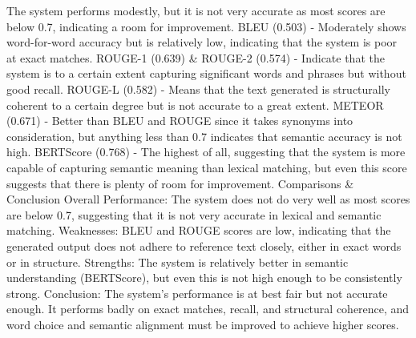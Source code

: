 The system performs modestly, but it is not very accurate as most scores are below 0.7, indicating a room for improvement.
 BLEU (0.503) - Moderately shows word-for-word accuracy but is relatively low, indicating that the system is poor at exact matches.
ROUGE-1 (0.639) \& ROUGE-2 (0.574) - Indicate that the system is to a certain extent capturing significant words and phrases but without good recall.
ROUGE-L (0.582) - Means that the text generated is structurally coherent to a certain degree but is not accurate to a great extent.
METEOR (0.671) - Better than BLEU and ROUGE since it takes synonyms into consideration, but anything less than 0.7 indicates that semantic accuracy is not high.
BERTScore (0.768) - The highest of all, suggesting that the system is more capable of capturing semantic meaning than lexical matching, but even this score suggests that there is plenty of room for improvement.
Comparisons \& Conclusion
Overall Performance: The system does not do very well as most scores are below 0.7, suggesting that it is not very accurate in lexical and semantic matching.
Weaknesses: BLEU and ROUGE scores are low, indicating that the generated output does not adhere to reference text closely, either in exact words or in structure.
Strengths: The system is relatively better in semantic understanding (BERTScore), but even this is not high enough to be consistently strong.
Conclusion: The system's performance is at best fair but not accurate enough. It performs badly on exact matches, recall, and structural coherence, and word choice and semantic alignment must be improved to achieve higher scores.